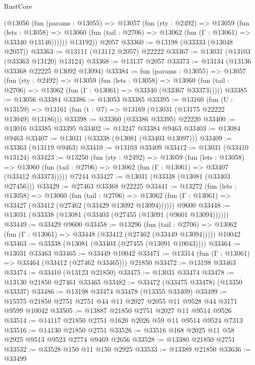 \begin{lexlean}{RustCore}
\begin{coremodule}
        (@13056
          (fun (params : @13055) =>
          @13057
            (fun (rty : @2492) =>
            @13059
              (fun (lets : @13058) =>
              @13060 (fun (tail : @2706) => @13062 (fun (Γ : @13061) => @33340 @13146))))))
        @13192))
    @2057
@33360 := @13198 (@33333 (@13048 @2057))
@33363 := @13111 (@13112 @2057) @22222
@33367 := @13031 (@13103 (@33363 @13120) @13124)
@33368 := @13137 @2057
@33373 := @13134 (@13136 @33368 @22225 @13092 @13094)
@33384 := fun (params : @13055) =>
  @13057
    (fun (rty : @2492) =>
    @13059
      (fun (lets : @13058) =>
      @13060 (fun (tail : @2706) => @13062 (fun (Γ : @13061) => @33340 (@33367 @33373)))))
@33385 := @13056 @33384
@33386 := @13053 @33385
@33395 := @13160
    (fun (U : @13159) => @13161 (fun (t : @7) => @13169 (@13031 (@13175 @22222 @13049) @13186)))
@33398 := @33360 (@33386 @33395) @22220
@33400 := @13016 @33385 @33395
@33402 := @13247 @33384 @9463
@33403 := @13084 @9463
@33407 := @13031 (@33338 (@13081 (@33403 @13097)))
@33409 := @33363 (@13119 @9463)
@33410 := @13103 @33409
@33412 := @13031 (@33410 @13124)
@33423 := @13250
    (fun (rty : @2492) =>
    @13059
      (fun (lets : @13058) =>
      @13060 (fun (tail : @2706) => @13062 (fun (Γ : @13061) => @33407 (@33412 @33373)))))
    @7244
@33427 := @13031 (@33338 (@13081 (@33403 @27456)))
@33429 := @27463 @33368 @22225
@33441 := @13272
    (fun (lets : @13058) =>
    @13060
      (fun (tail : @2706) =>
      @13062 (fun (Γ : @13061) => @33427 (@33412 (@27462 (@33429 @13092 @13094))))))
    @9600
@33448 := @13031 (@33338 (@13081 (@33403 (@27455 (@13091 (@9601 @13094))))))
@33449 := @33429 @9600
@33458 := @13296
    (fun (tail : @2706) => @13062 (fun (Γ : @13061) => @33448 (@33412 (@27462 (@33449 @13094)))))
    @10042
@33463 := @33338 (@13081 (@33403 (@27455 (@13091 @10043))))
@33464 := @13031 @33463
@33465 := @33449 @10042
@33471 := @13314 (fun (Γ : @13061) => @33464 (@33412 (@27462 @33465))) @21850
@33472 := @13198 @33463
@33474 := @33410 (@13123 @21850)
@33475 := @13031 @33474
@33478 := @13130 @21850 @27461 @33465
@33482 := @33472 (@33475 @33478) (@13350 @33337)
@33486 := @13198 @33474 @33478 (@13355 @33409)
@33499 := @15575 @21850 @2751 @2751 @44 @11 @2027 @2055 @11 @9528 @44 @3171 @9599 @10042
@33505 := @13887 @21850 @2751 @2027 @11 @9514 @9526
@33514 := @14117 @21850 @2751 @1620 @2026 @59 @11 @9514 @9524 @7313
@33516 := @14130 @21850 @2751
@33526 := @33516 @168 @2025 @11 @58 @2925 @9513 @9523 @2774 @9469 @2656
@33528 := @13380 @21850 @2751
@33532 := @33528 @150 @11 @150 @2925
@33533 := @13389 @21850
@33636 := @33499

\end{coremodule}
\end{lexlean}
